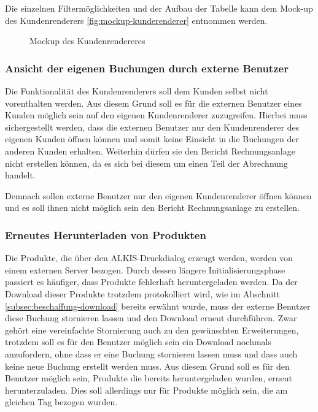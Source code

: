 Die einzelnen Filtermöglichkeiten und der Aufbau der Tabelle kann dem Mock-up des Kundenrenderers \vref{fig:mockup-kunderenderer} entnommen werden.

\begin{figure}[htb]
	\centering
	\caption{Mockup des Kundenrendereres}
	\label{fig:mockup-kunderenderer}
\end{figure}

\subsubsection{Ansicht der eigenen Buchungen durch externe Benutzer}
Die Funktionalität des Kundenrenderers soll dem Kunden selbst nicht vorenthalten werden.
Aus diesem Grund soll es für die externen Benutzer eines Kunden möglich sein auf den eigenen Kundenrenderer zuzugreifen.
Hierbei muss sichergestellt werden, dass die externen Benutzer nur den Kundenrenderer des eigenen Kunden öffnen können und somit keine Einsicht in die Buchungen der anderen Kunden erhalten. 
Weiterhin dürfen sie den Bericht Rechnungsanlage nicht erstellen können, da es sich bei diesem um einen Teil der Abrechnung handelt.

Demnach sollen externe Benutzer nur den eigenen Kundenrenderer öffnen können und es soll ihnen nicht möglich sein den Bericht Rechnungsanlage zu erstellen.

\subsubsection{Erneutes Herunterladen von Produkten}
Die Produkte, die über den ALKIS-Druckdialog erzeugt werden, werden von einem externen Server bezogen.
Durch dessen längere Initialisierungsphase passiert es häufiger, dass Produkte fehlerhaft heruntergeladen werden.
Da der Download dieser Produkte trotzdem protokolliert wird, wie im Abschnitt \vref{subsec:beschaffung-download} bereits erwähnt wurde, muss der externe Benutzer diese Buchung stornieren lassen und den Download erneut durchführen.
Zwar gehört eine vereinfachte Stornierung auch zu den gewünschten Erweiterungen, trotzdem soll es für den Benutzer möglich sein ein Download nochmals anzufordern, ohne dass er eine Buchung stornieren lassen muss und dass auch keine neue Buchung erstellt werden muss.
Aus diesem Grund soll es für den Benutzer möglich sein, Produkte die bereits heruntergeladen wurden, erneut herunterzuladen. Dies soll allerdings nur für Produkte möglich sein, die am gleichen Tag bezogen wurden. 

